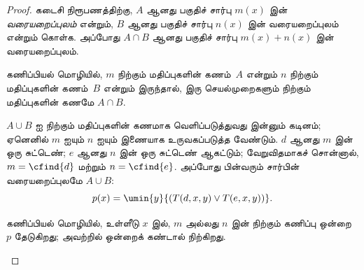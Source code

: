 \documentclass[../../../include/open-logic-section]{subfiles}
\begin{document}
\begin{proof}
கடைசி நிரூபணத்திற்கு, $A$ ஆனது பகுதிச் சார்பு $m(x)$ இன்
\emph{வரையறைப்புலம்} என்றும், $B$ ஆனது பகுதிச் சார்பு $n(x)$ இன்
வரையறைப்புலம் என்றும் கொள்க. அப்போது $A \cap B$ ஆனது பகுதிச்
சார்பு $m(x) + n(x)$ இன் வரையறைப்புலம்.

\begin{explain}
கணிப்பியல் மொழியில், $m$ நிற்கும் மதிப்புகளின் கணம்~$A$ என்றும்
$n$ நிற்கும் மதிப்புகளின் கணம்~$B$ என்றும் இருந்தால், இரு
செயல்முறைகளும் நிற்கும் மதிப்புகளின் கணமே $A \cap B$.
\end{explain}

$A \cup B$ ஐ நிற்கும் மதிப்புகளின் கணமாக வெளிப்படுத்துவது இன்னும்
கடினம்; ஏனெனில் $m$ ஐயும் $n$ ஐயும் இணையாக உருவகப்படுத்த வேண்டும்.
$d$ ஆனது $m$ இன் ஒரு சுட்டெண்; $e$ ஆனது $n$ இன் ஒரு சுட்டெண்
ஆகட்டும்; வேறுவிதமாகச் சொன்னால், $m = \cfind{d}$ மற்றும்
$n = \cfind{e}$. அப்போது பின்வரும் சார்பின் வரையறைப்புலமே
$A \cup B$:
\[
p(x) = \umin{y}{(T(d,x,y) \lor T(e,x,y))}.
\]
\begin{explain}
கணிப்பியல் மொழியில், உள்ளீடு $x$ இல், $m$ அல்லது $n$ இன்
நிற்கும் கணிப்பு ஒன்றை~$p$ தேடுகிறது; அவற்றில் ஒன்றைக் கண்டால்
நிற்கிறது.
\end{explain}
\end{proof}
\end{document}
